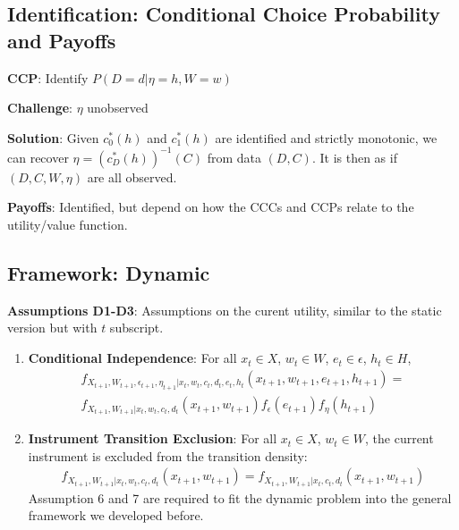 \documentclass[
  letterpaper,
  DIV=11,
  numbers=noendperiod]{scrartcl}
\providecommand{\tightlist}{%
  \setlength{\itemsep}{0pt}\setlength{\parskip}{0pt}}\usepackage{longtable,booktabs,array}
\begin{document}
\subsection{Identification: Conditional Choice Probability and
Payoffs}\label{identification-conditional-choice-probability-and-payoffs}

\textbf{CCP}: Identify \(P(D = d | \eta = h, W = w)\)

\textbf{Challenge}: \(\eta\) unobserved

\textbf{Solution}: Given \(c^{*}_0(h)\) and \(c^{*}_1(h)\) are
identified and strictly monotonic, we can recover
\(\eta = (c^{*}_D(h))^{-1}(C)\) from data \((D,C)\). It is then as if
\((D,C,W,\eta)\) are all observed.

\textbf{Payoffs}: Identified, but depend on how the CCCs and CCPs relate
to the utility/value function.

\subsection{Framework: Dynamic}\label{framework-dynamic}

\textbf{Assumptions D1-D3}: Assumptions on the curent utility, similar
to the static version but with \(t\) subscript.

\begin{enumerate}
\def\labelenumi{\arabic{enumi}.}
\setcounter{enumi}{5}
\tightlist
\item
  \textbf{Conditional Independence}: For all \(x_t \in X\),
  \(w_t \in W\), \(e_t \in \epsilon\), \(h_t \in H\), \[
  \begin{align}
    f_{X_{t+1},W_{t+1},\epsilon_{t+1},\eta_{t+1}|x_{t},w_{t},c_{t},d_{t},e_{t},h_{t}}(x_{t+1},w_{t+1},e_{t+1},h_{t+1}) = \\
    f_{X_{t+1},W_{t+1}|x_{t},w_{t},c_{t},d_{t}}(x_{t+1},w_{t+1})f_{\epsilon}(e_{t+1})f_{\eta}(h_{t+1})
  \end{align}
  \]
\item
  \textbf{Instrument Transition Exclusion}: For all \(x_t \in X\),
  \(w_t \in W\), the current instrument is excluded from the transition
  density: \[
  \begin{align}
    f_{X_{t+1},W_{t+1}|x_{t},w_{t},c_{t},d_{t}}(x_{t+1},w_{t+1}) =
    f_{X_{t+1},W_{t+1}|x_{t},c_{t},d_{t}}(x_{t+1},w_{t+1})
  \end{align}
  \] Assumption 6 and 7 are required to fit the dynamic problem into the
  general framework we developed before.
\end{enumerate}
\end{document}
